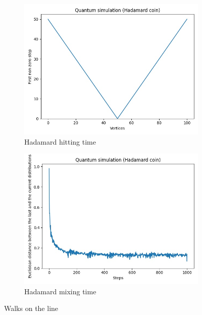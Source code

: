 \begin{figure}[H]
  \centering
  \begin{subfigure}{.45\linewidth}
    \centering
    \includegraphics[width=\linewidth]{./figures/results/path/hadamard_hitting_time.jpg}
    \caption{Hadamard hitting time}
  \end{subfigure}
  \begin{subfigure}{.45\linewidth}
    \centering
    \includegraphics[width=\linewidth]{./figures/results/path/hadamard_mixing_time.jpg}
    \caption{Hadamard mixing time}
  \end{subfigure}
  \caption{Walks on the line}
\end{figure}

